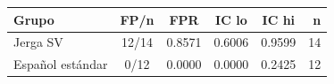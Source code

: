 \begin{tabular}{lccccr}
\toprule
Grupo & FP/n & FPR & IC lo & IC hi & n \\
\midrule
Jerga SV & 12/14 & 0.8571 & 0.6006 & 0.9599 & 14 \\
Español estándar & 0/12 & 0.0000 & 0.0000 & 0.2425 & 12 \\
\bottomrule
\end{tabular}
